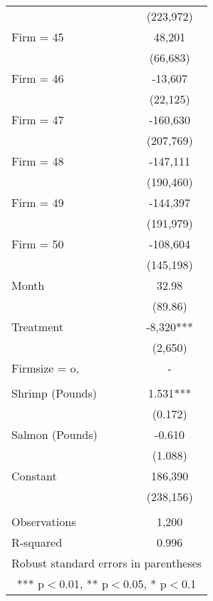 \begin{tabular}{lc}
 & (223,972) \\
Firm = 45 & 48,201 \\
 & (66,683) \\
Firm = 46 & -13,607 \\
 & (22,125) \\
Firm = 47 & -160,630 \\
 & (207,769) \\
Firm = 48 & -147,111 \\
 & (190,460) \\
Firm = 49 & -144,397 \\
 & (191,979) \\
Firm = 50 & -108,604 \\
 & (145,198) \\
Month & 32.98 \\
 & (89.86) \\
Treatment & -8,320*** \\
 & (2,650) \\
Firmsize = o, & - \\
 &  \\
Shrimp (Pounds) & 1.531*** \\
 & (0.172) \\
Salmon (Pounds) & -0.610 \\
 & (1.088) \\
Constant & 186,390 \\
 & (238,156) \\
 &  \\
Observations & 1,200 \\
 R-squared & 0.996 \\ \hline
\multicolumn{2}{c}{ Robust standard errors in parentheses} \\
\multicolumn{2}{c}{ *** p$<$0.01, ** p$<$0.05, * p$<$0.1} \\
\end{tabular}
